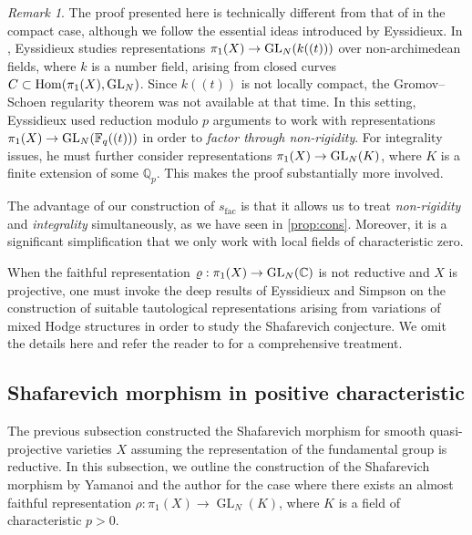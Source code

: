 \documentclass[english]{amsproc}
\theoremstyle{plain}
\theoremstyle{definition}
\theoremstyle{remark}
\newtheorem{rem}[thm]{Remark}
\theoremstyle{plain}
\numberwithin{equation}{thm} %
\newcommand{\GL}{{\rm GL}}
\begin{document}
\begin{rem}The proof presented here is technically different from that of \cite{Eys04} in the compact case, 
	although we follow the essential ideas introduced by Eyssidieux.  
	In \cite{Eys04}, Eyssidieux studies representations 
	\(\pi_1(X)\to \GL_{N}(k((t)))\) over non-archimedean fields, where \(k\) is a number field, 
	arising from closed curves \(C \subset \mathrm{Hom}(\pi_1(X),\GL_{N})\).  
	Since \(k((t))\) is not locally compact, the Gromov–Schoen regularity theorem was not available 
	at that time. %
 	In this setting, Eyssidieux used reduction modulo \(p\) arguments to work with representations 
	\(\pi_1(X)\to \GL_{N}(\mathbb{F}_{q}((t)))\) in order to \emph{factor through non-rigidity}.  
	For integrality issues, he must further consider representations 
	\(\pi_1(X)\to \GL_{N}(K)\), where \(K\) is a finite extension of some \(\mathbb{Q}_p\).  
	This makes the proof substantially more involved.
	
	The advantage of our construction of \(s_{\mathrm{fac}}\) is that it allows us to treat 
	\emph{non-rigidity} and \emph{integrality} simultaneously, as we have seen in \cref{prop:cons}.  
	Moreover, it is a significant simplification that we only work with local fields of 
	characteristic zero.
	
	When the faithful representation \(\varrho:\pi_1(X)\to \GL_{N}(\mathbb{C})\) is not reductive and 
	\(X\) is projective, one must invoke the deep results of Eyssidieux and Simpson \cite{ES11} on the 
	construction of suitable tautological representations arising from variations of mixed Hodge 
	structures in order to study the Shafarevich conjecture. 
	We omit the details here and refer the reader to \cite{EKPR12} for a comprehensive treatment.
\end{rem}
\subsection{Shafarevich morphism in positive characteristic}
The previous subsection constructed the Shafarevich morphism for smooth quasi-projective varieties $X$ assuming the representation of the fundamental group is reductive. In this subsection, we outline the construction of the Shafarevich morphism by Yamanoi and the author  \cite{DY23b} for the case where there exists an almost faithful representation $\rho \colon \pi_1(X) \to \operatorname{GL}_{N}(K)$, where $K$ is a field of   characteristic $p>0$.
\end{document}
